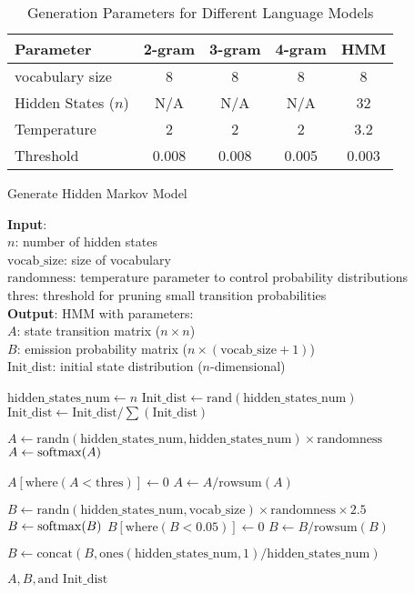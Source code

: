 \vspace{-20pt}
\begin{table}[H]
\caption{Generation Parameters for Different Language Models}
\label{tab:language-params}
\begin{center}
\begin{tabular}{lcccc}
\hline
\textbf{Parameter} & \textbf{2-gram} & \textbf{3-gram} & \textbf{4-gram} & \textbf{HMM} \\
\hline
vocabulary size & 8 & 8 & 8 & 8 \\
Hidden States ($n$) & N/A & N/A & N/A & 32 \\
Temperature & 2 & 2 & 2 & 3.2 \\
Threshold & 0.008 & 0.008 & 0.005 & 0.003 \\
\hline
\end{tabular}
\end{center}
\end{table}


\begin{algorithm}[H]
\caption{Generate Hidden Markov Model}
\label{alg:hmm4hmm}
\textbf{Input}: \\
\quad $n$: number of hidden states \\
\quad $\text{vocab\_size}$: size of vocabulary \\
\quad $\text{randomness}$: temperature parameter to control probability distributions \\
\quad $\text{thres}$: threshold for pruning small transition probabilities \\
\textbf{Output}: HMM with parameters: \\
\quad $A$: state transition matrix ($n \times n$) \\
\quad $B$: emission probability matrix ($n \times (\text{vocab\_size}+1)$) \\
\quad $\text{Init\_dist}$: initial state distribution ($n$-dimensional)
\begin{algorithmic}[1]
\STATE $\text{hidden\_states\_num} \gets n$
\STATE $\text{Init\_dist} \gets \text{rand}(\text{hidden\_states\_num})$
\STATE $\text{Init\_dist} \gets \text{Init\_dist} / \sum(\text{Init\_dist})$

\STATE $A \gets \text{randn}(\text{hidden\_states\_num}, \text{hidden\_states\_num}) \times \text{randomness}$
\STATE $A \gets \mathrm{softmax}(A)$

    \STATE $A[\text{where}(A < \text{thres})] \gets 0$
    \STATE $A \gets A / \text{rowsum}(A)$
\ENDIF

\STATE $B \gets \text{randn}(\text{hidden\_states\_num}, \text{vocab\_size}) \times \text{randomness} \times 2.5$
\STATE $B \gets \mathrm{softmax}(B)$
\STATE $B[\text{where}(B < 0.05)] \gets 0$
\STATE $B \gets B / \text{rowsum}(B)$

\STATE $B \gets \text{concat}(B, \text{ones}(\text{hidden\_states\_num}, 1) / \text{hidden\_states\_num})$

\RETURN $A, B, \text{and Init\_dist}$
\end{algorithmic}
\end{algorithm}




